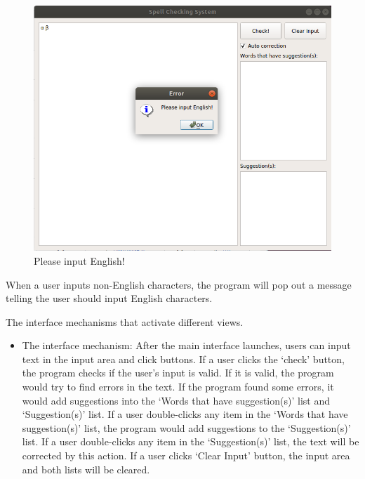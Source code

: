 \begin{itemize}
\begin{figure}[H]
		\includegraphics[width=\linewidth]{fig/eng.png}
		\caption{Please input English!}
		\label{fig:eng}
	\end{figure}
	When a user inputs non-English characters, the program will pop out a message telling the user should input English characters.
	 \end{itemize}
	The  interface mechanisms that activate different views.
	\begin{itemize} 
	\item{The interface mechanism: }
	After the main interface launches, users can input text in the input area and click buttons. If a user clicks the `check' button, the program checks if the user's input is valid. If it is valid, the program would try to find errors in the text. If the program found some errors, it would add suggestions into the `Words that have suggestion(s)' list and `Suggestion(s)' list. If a user double-clicks any item in the `Words that have suggestion(s)' list, the program would add suggestions to the `Suggestion(s)' list. If a user double-clicks any item in the `Suggestion(s)' list, the text will be corrected by this action. If a user clicks `Clear Input' button, the input area and both lists will be cleared.
	 \end{itemize}

